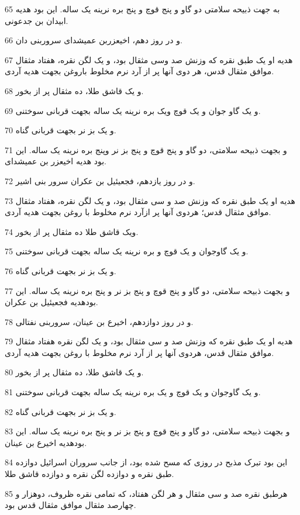 \par 65 به جهت ذبیحه سلامتی دو گاو و پنج قوچ و پنج بره نرینه یک ساله. این بود هدیه ابیدان بن جدعونی.
\par 66 و در روز دهم، اخیعزربن عمیشدای سروربنی دان.
\par 67 هدیه او یک طبق نقره که وزنش صد وسی مثقال بود، و یک لگن نقره، هفتاد مثقال موافق مثقال قدس، هر دوی آنها پر از آرد نرم مخلوط باروغن بجهت هدیه آردی.
\par 68 و یک قاشق طلا، ده مثقال پر از بخور.
\par 69 و یک گاو جوان و یک قوچ ویک بره نرینه یک ساله بجهت قربانی سوختنی.
\par 70 و یک بز نر بجهت قربانی گناه.
\par 71 و بجهت ذبیحه سلامتی، دو گاو و پنج قوچ و پنج بز نر وپنج بره نرینه یک ساله. این بود هدیه اخیعزر بن عمیشدای.
\par 72 و در روز یازدهم، فجعیئیل بن عکران سرور بنی اشیر.
\par 73 هدیه او یک طبق نقره که وزنش صد و سی مثقال بود، و یک لگن نقره، هفتاد مثقال موافق مثقال قدس؛ هردوی آنها پر ازآرد نرم مخلوط با روغن بجهت هدیه آردی.
\par 74 ویک قاشق طلا ده مثقال پر از بخور.
\par 75 و یک گاوجوان و یک قوچ و بره نرینه یک ساله بجهت قربانی سوختنی.
\par 76 و یک بز نر بجهت قربانی گناه.
\par 77 و بجهت ذبیحه سلامتی، دو گاو و پنج قوچ و پنج بز نر و پنج بره نرینه یک ساله. این بودهدیه فجعیئیل بن عکران.
\par 78 و در روز دوازدهم، اخیرع بن عینان، سروربنی نفتالی.
\par 79 هدیه او یک طبق نقره که وزنش صد و سی مثقال بود، و یک لگن نقره هفتاد مثقال موافق مثقال قدس، هردوی آنها پر از آرد نرم مخلوط با روغن بجهت هدیه آردی.
\par 80 و یک قاشق طلا، ده مثقال پر از بخور.
\par 81 و یک گاوجوان و یک قوچ و یک بره نرینه یک ساله بجهت قربانی سوختنی.
\par 82 و یک بز نر بجهت قربانی گناه.
\par 83 و بجهت ذبیحه سلامتی، دو گاو و پنج قوچ و پنج بز نر و پنج بره نرینه یک ساله. این بودهدیه اخیرع بن عینان.
\par 84 این بود تبرک مذبح در روزی که مسح شده بود، از جانب سروران اسرائیل دوازده طبق نقره و دوازده لگن نقره و دوازده قاشق طلا.
\par 85 هرطبق نقره صد و سی مثقال و هر لگن هفتاد، که تمامی نقره ظروف، دوهزار و چهارصد مثقال موافق مثقال قدس بود.
